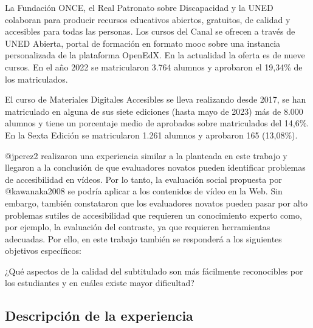 \documentclass[
  letterpaper,
  DIV=11,
  numbers=noendperiod]{scrartcl}
\begin{document}
La Fundación ONCE, el Real Patronato sobre Discapacidad y la UNED
colaboran para producir recursos educativos abiertos, gratuitos, de
calidad y accesibles para todas las personas. Los cursos del Canal se
ofrecen a través de UNED Abierta, portal de formación en formato
\gls{mooc} sobre una instancia personalizada de la plataforma OpenEdX.
En la actualidad la oferta es de nueve cursos. En el año 2022 se
matricularon 3.764 alumnos y aprobaron el 19,34\% de los matriculados.

El curso de Materiales Digitales Accesibles se lleva realizando desde
2017, se han matriculado en alguna de sus siete ediciones (hasta mayo de
2023) más de 8.000 alumnos y tiene un porcentaje medio de aprobados
sobre matriculados del 14,6\%. En la Sexta Edición se matricularon 1.261
alumnos y aprobaron 165 (13,08\%).

@jperez2 realizaron una experiencia similar a la planteada en este
trabajo y llegaron a la conclusión de que evaluadores novatos pueden
identificar problemas de accesibilidad en vídeos. Por lo tanto, la
evaluación social propuesta por @kawanaka2008 se podría aplicar a los
contenidos de vídeo en la Web. Sin embargo, también constataron que los
evaluadores novatos pueden pasar por alto problemas sutiles de
accesibilidad que requieren un conocimiento experto como, por ejemplo,
la evaluación del contraste, ya que requieren herramientas adecuadas.
Por ello, en este trabajo también se responderá a los siguientes
objetivos específicos:

\begin{tcolorbox}[enhanced jigsaw, titlerule=0mm, toptitle=1mm, bottomrule=.15mm, bottomtitle=1mm, breakable, opacityback=0, colback=white, rightrule=.15mm, leftrule=.75mm, coltitle=black, opacitybacktitle=0.6, colbacktitle=quarto-callout-tip-color!10!white, title=\textcolor{quarto-callout-tip-color}{\faLightbulb}\hspace{0.5em}{Objetivos específicos}, colframe=quarto-callout-tip-color-frame, arc=.35mm, toprule=.15mm, left=2mm]

¿Qué aspectos de la calidad del subtitulado son más fácilmente
reconocibles por los estudiantes y en cuáles existe mayor dificultad?

\end{tcolorbox}

\hypertarget{descripciuxf3n-de-la-experiencia}{%
\subsection{Descripción de la
experiencia}\label{descripciuxf3n-de-la-experiencia}}
\end{document}
